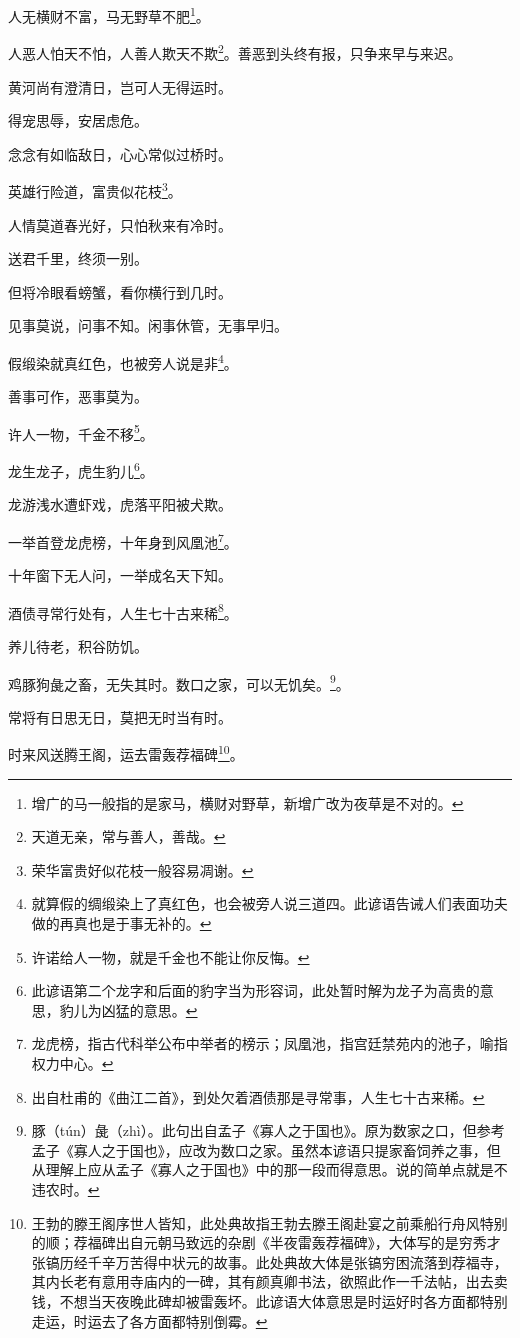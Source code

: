 \documentclass[12pt,oneside]{book}
\begin{document}
人无横财不富，马无野草不肥\footnote{增广的马一般指的是家马，横财对野草，新增广改为夜草是不对的。}。

人恶人怕天不怕，人善人欺天不欺\footnote{天道无亲，常与善人，善哉。}。善恶到头终有报，只争来早与来迟。

黄河尚有澄清日，岂可人无得运时。

得宠思辱，安居虑危。

念念有如临敌日，心心常似过桥时。

英雄行险道，富贵似花枝\footnote{荣华富贵好似花枝一般容易凋谢。}。

人情莫道春光好，只怕秋来有冷时。

送君千里，终须一别。

但将冷眼看螃蟹，看你横行到几时。

见事莫说，问事不知。闲事休管，无事早归。

假缎染就真红色，也被旁人说是非\footnote{就算假的绸缎染上了真红色，也会被旁人说三道四。此谚语告诫人们表面功夫做的再真也是于事无补的。}。

善事可作，恶事莫为。

许人一物，千金不移\footnote{许诺给人一物，就是千金也不能让你反悔。}。

龙生龙子，虎生豹儿\footnote{此谚语第二个龙字和后面的豹字当为形容词，此处暂时解为龙子为高贵的意思，豹儿为凶猛的意思。}。

龙游浅水遭虾戏，虎落平阳被犬欺。

一举首登龙虎榜，十年身到风凰池\footnote{龙虎榜，指古代科举公布中举者的榜示；凤凰池，指宫廷禁苑内的池子，喻指权力中心。}。

十年窗下无人问，一举成名天下知。

酒债寻常行处有，人生七十古来稀\footnote{出自杜甫的《曲江二首》，到处欠着酒债那是寻常事，人生七十古来稀。}。

养儿待老，积谷防饥。

鸡豚狗彘之畜，无失其时。数口之家，可以无饥矣。\footnote{豚（tún）彘（zhì）。此句出自孟子《寡人之于国也》。原为数家之口，但参考孟子《寡人之于国也》，应改为数口之家。虽然本谚语只提家畜饲养之事，但从理解上应从孟子《寡人之于国也》中的那一段而得意思。说的简单点就是不违农时。}。

常将有日思无日，莫把无时当有时。

时来风送腾王阁，运去雷轰荐福碑\footnote{王勃的滕王阁序世人皆知，此处典故指王勃去滕王阁赴宴之前乘船行舟风特别的顺；荐福碑出自元朝马致远的杂剧《半夜雷轰荐福碑》，大体写的是穷秀才张镐历经千辛万苦得中状元的故事。此处典故大体是张镐穷困流落到荐福寺，其内长老有意用寺庙内的一碑，其有颜真卿书法，欲照此作一千法帖，出去卖钱，不想当天夜晚此碑却被雷轰坏。此谚语大体意思是时运好时各方面都特别走运，时运去了各方面都特别倒霉。}。
\end{document}
